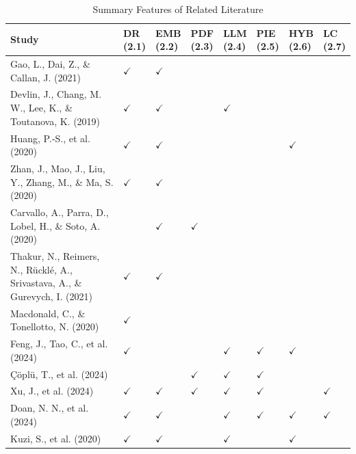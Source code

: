 \begin{table}[htbp]
  \centering
  \caption{Summary Features of Related Literature}\label{tab:rrl-summary}
  \small
  \begin{tabularx}{\linewidth}{@{}X*{7}{>{\centering\arraybackslash}p{1.15cm}}@{}}
    \toprule
    \textbf{Study} & \makecell{\textbf{DR}\\\textbf{(2.1)}} & \makecell{\textbf{EMB}\\\textbf{(2.2)}} & \makecell{\textbf{PDF}\\\textbf{(2.3)}} & \makecell{\textbf{LLM}\\\textbf{(2.4)}} & \makecell{\textbf{PIE}\\\textbf{(2.5)}} & \makecell{\textbf{HYB}\\\textbf{(2.6)}} & \makecell{\textbf{LC}\\\textbf{(2.7)}} \\
    \midrule
    Gao, L., Dai, Z., \& Callan, J. (2021) & $\checkmark$ & $\checkmark$ &  &  &  &  &  \\
    Devlin, J., Chang, M. W., Lee, K., \& Toutanova, K. (2019) & $\checkmark$ & $\checkmark$ &  & $\checkmark$ &  &  &  \\
    Huang, P.-S., et al. (2020) & $\checkmark$ & $\checkmark$ &  &  &  & $\checkmark$ &  \\
    Zhan, J., Mao, J., Liu, Y., Zhang, M., \& Ma, S. (2020) & $\checkmark$ & $\checkmark$ &  &  &  &  &  \\
    Carvallo, A., Parra, D., Lobel, H., \& Soto, A. (2020) &  & $\checkmark$ & $\checkmark$ &  &  &  &  \\
    Thakur, N., Reimers, N., Rücklé, A., Srivastava, A., \& Gurevych, I. (2021) & $\checkmark$ & $\checkmark$ &  &  &  &  &  \\
    Macdonald, C., \& Tonellotto, N. (2020) & $\checkmark$ &  &  &  &  &  &  \\
    Feng, J., Tao, C., et al. (2024) & $\checkmark$ &  &  & $\checkmark$ & $\checkmark$ & $\checkmark$ &  \\
    Çöplü, T., et al. (2024) &  &  & $\checkmark$ & $\checkmark$ & $\checkmark$ &  &  \\
    Xu, J., et al. (2024) & $\checkmark$ & $\checkmark$ & $\checkmark$ & $\checkmark$ & $\checkmark$ &  & $\checkmark$ \\
    Doan, N. N., et al. (2024) & $\checkmark$ & $\checkmark$ &  & $\checkmark$ & $\checkmark$ & $\checkmark$ & $\checkmark$ \\
    Kuzi, S., et al. (2020) & $\checkmark$ & $\checkmark$ &  & $\checkmark$ &  & $\checkmark$ &  \\

\end{tabularx}
\end{table}
